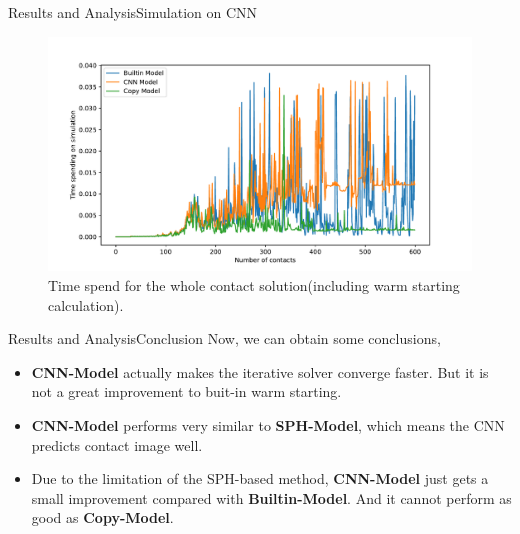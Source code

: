\documentclass{beamer}
\begin{document}
\begin{frame}{Results and Analysis}{Simulation on CNN}
\begin{figure}[!h]
        \centering
            \includegraphics[scale = 0.4]{../report/Figures/cnntotal}
            \caption{Time spend for the whole contact solution(including warm starting calculation).}
\end{figure}
\end{frame}

\begin{frame}{Results and Analysis}{Conclusion}
Now, we can obtain some conclusions,
\pause
\begin{itemize}
    \item \textbf{CNN-Model} actually makes the iterative solver converge faster. But it is not a great improvement to buit-in warm starting.
    \pause
    \item \textbf{CNN-Model} performs very similar to \textbf{SPH-Model}, which means the CNN predicts contact image well.
    \pause
    \item Due to the limitation of the SPH-based method, \textbf{CNN-Model} just gets a small improvement compared with \textbf{Builtin-Model}. And it cannot perform as good as \textbf{Copy-Model}.
\end{itemize}
\end{frame}
\end{document}
